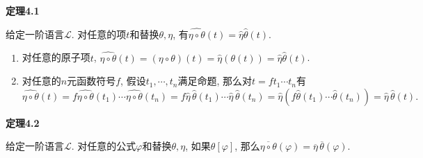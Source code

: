\documentclass[UTF8]{ctexart}
\begin{document}
\hypertarget{sec:定理4.1}{}
\noindent\textbf{定理4.1}

给定一阶语言$\mathcal{L}$. 对任意的项$t$和替换$\theta,\eta$,
有$\widehat{\eta\circ\theta}(t)=\widehat{\eta}\widehat{\theta}(t)$.


\begin{enumerate}
    \item 对任意的原子项$t$, $\widehat{\eta\circ\theta}(t)=(\eta\circ\theta)(t)=
    \widehat{\eta}(\theta(t))=\widehat{\eta}\widehat{\theta}(t)$.
    \item 对任意的$n$元函数符号$f$, 假设$t_1,\cdots,t_n$满足命题,
    那么对$t=ft_1\cdots t_n$有
    \vspace{3pt}
    \begin{equation*}
        \widehat{\eta\circ\theta}(t)=
        f\widehat{\eta\circ\theta}(t_1)\cdots\widehat{\eta\circ\theta}(t_n)=
        f\widehat{\eta}\,\widehat{\theta}(t_1)\cdots
        \widehat{\eta}\,\widehat{\theta}(t_n)=
        \widehat{\eta}\left(f\widehat{\theta}(t_1)\cdots\widehat{\theta}(t_n)\right)
        =\widehat{\eta}\,\widehat{\theta}(t).
    \tag*{\qedsymbol}\end{equation*}
\end{enumerate}

\vspace{10pt}

\hypertarget{sec:定理4.2}{}
\noindent\textbf{定理4.2}

给定一阶语言$\mathcal{L}$. 对任意的公式$\varphi$和替换$\theta,\eta$,
如果$\theta[\varphi]$, 那么$\overline{\eta\circ\theta}(\varphi)=
\overline{\eta}\,\overline{\theta}(\varphi)$.

\end{document}
